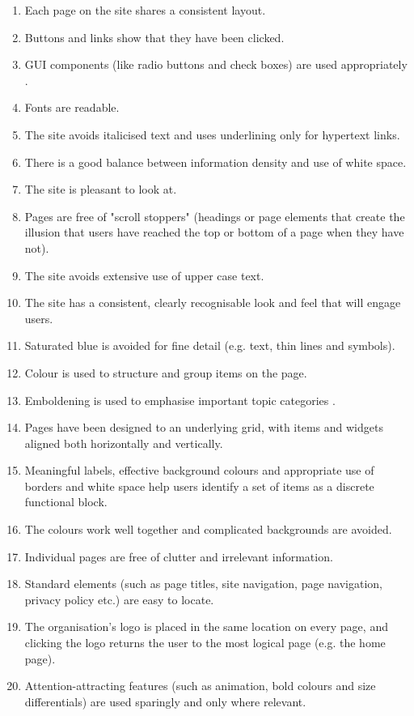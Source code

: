\begin{itemize}
\begin{enumerate}
        \item Each page on the site shares a consistent layout.
        \item Buttons and links show that they have been clicked.
        \item GUI components (like radio buttons and check boxes) are used appropriately .
        \item Fonts are readable.
        \item The site avoids italicised text and uses underlining only for hypertext links.
        \item There is a good balance between information density and use of white space.
        \item The site is pleasant to look at.
        \item Pages are free of "scroll stoppers" (headings or page elements that create the illusion that users have reached the top or bottom of a page when they have not).
        \item The site avoids extensive use of upper case text.
        \item The site has a consistent, clearly recognisable look and feel that will engage users.
        \item Saturated blue is avoided for fine detail (e.g. text, thin lines and symbols).
        \item Colour is used to structure and group items on the page.
        \item Emboldening is used to emphasise important topic categories .
        \item Pages have been designed to an underlying grid, with items and widgets aligned both horizontally and vertically.
        \item Meaningful labels, effective background colours and appropriate use of borders and white space help users identify a set of items as a discrete functional block.
        \item The colours work well together and complicated backgrounds are avoided.
        \item Individual pages are free of clutter and irrelevant information.
        \item Standard elements (such as page titles, site navigation, page navigation, privacy policy etc.) are easy to locate.
        \item The organisation's logo is placed in the same location on every page, and clicking the logo returns the user to the most logical page (e.g. the home page).
        \item Attention-attracting features (such as animation, bold colours and size differentials) are used sparingly and only where relevant.

\end{enumerate}
\end{itemize}
